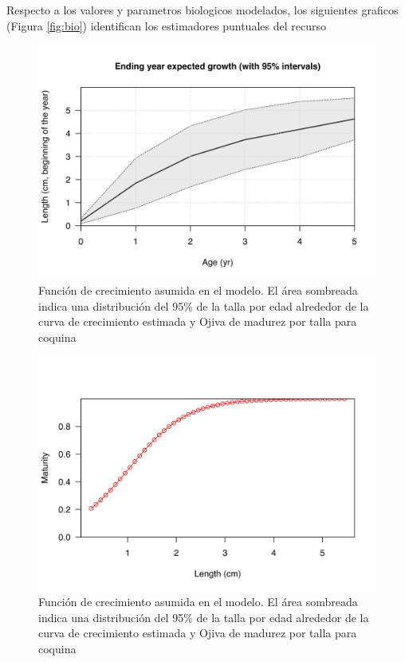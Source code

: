 \documentclass[
]{article}
\begin{document}
Respecto a los valores y parametros biologicos modelados, los siguientes graficos (Figura \ref{fig:bio}) identifican los estimadores puntuales del recurso

\begin{figure}[H]

{\centering \includegraphics[width=0.8\linewidth]{Dtrunculus_SS3_2024_files/figure-latex/bio-1} 

}

\caption{\label{fig:bio}Función de crecimiento asumida en el modelo. El área sombreada indica una distribución del 95\% de la talla por edad alrededor de la curva de crecimiento estimada y Ojiva de madurez por talla para coquina}\label{fig:bio-1}
\end{figure}
\begin{figure}[H]

{\centering \includegraphics[width=0.8\linewidth]{Dtrunculus_SS3_2024_files/figure-latex/bio-2} 

}

\caption{\label{fig:bio}Función de crecimiento asumida en el modelo. El área sombreada indica una distribución del 95\% de la talla por edad alrededor de la curva de crecimiento estimada y Ojiva de madurez por talla para coquina}\label{fig:bio-2}
\end{figure}
\end{document}
